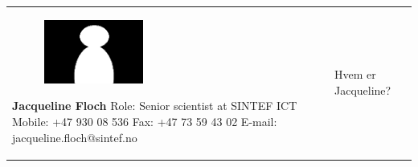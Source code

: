 \documentclass[11pt]{book}
\begin{document}
\begin{table}[H]
\centering
\begin{tabular}{ p{7cm} p{7cm} }
\parbox{7cm}{
\begin{figure}[H]
      \includegraphics[width=0.4\textwidth]{Figures/Person.png}
      \label{fig:partners_customer_jacqueline}
\end{figure}
\textbf{Jacqueline Floch}\\
Role: Senior scientist at SINTEF ICT\\
Mobile: +47 930 08 536\\
Fax: +47 73 59 43 02\\
E-mail: jacqueline.floch@sintef.no} & \parbox{7cm}{Hvem er Jacqueline?}
\end{tabular}
\label{tab:partners_customer_jacqueline}
\end{table}
\end{document}
